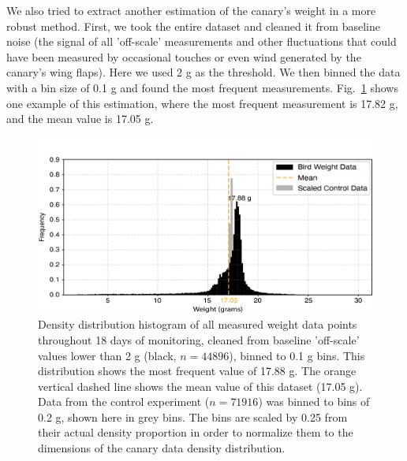 \documentclass{article}
\begin{document}
We also tried to extract another estimation of the canary's weight in a more robust method. First, we took the entire dataset and cleaned it from baseline noise (the signal of all 'off-scale' measurements and other fluctuations that could have been measured by occasional touches or even wind generated by the canary's wing flaps). Here we used 2 g as the threshold. We then binned the data with a bin size of 0.1 g and found the most frequent measurements. Fig.~\ref{fig:weight-histogram} shows one example of this estimation, where the most frequent measurement is 17.82 g, and the mean value is 17.05 g. 

\begin{figure}
    \centering
    \includegraphics[width=1\linewidth]{Figures/Histogram.png}
    \caption{Density distribution histogram of all measured weight data points throughout 18 days of monitoring, cleaned from baseline 'off-scale' values lower than 2 g (black, $n=44896$), binned to 0.1 g bins. This distribution shows the most frequent value of 17.88 g. The orange vertical dashed line shows the mean value of this dataset (17.05 g). Data from the control experiment ($n=71916$) was binned to bins of 0.2 g, shown here in grey bins. The bins are scaled by 0.25 from their actual density proportion in order to normalize them to the dimensions of the canary data density distribution.}
    \label{fig:weight-histogram}
\end{figure}
\end{document}

